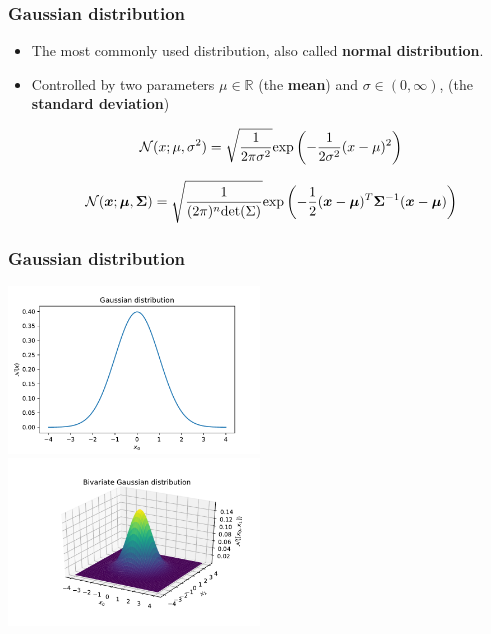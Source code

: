 \documentclass[notes]{beamer}          %
\newcommand{\vect}[1]{\bm{#1}}
\newcommand{\field}[1]{\mathbb{#1}}
\newcommand{\R}{\field{R}}
\begin{document}
\begin{frame}
\frametitle{Gaussian distribution}
\begin{itemize}
    \item The most commonly used distribution, also called {\bf normal distribution}.
    \item Controlled by two parameters $\mu \in \R$ (the {\bf mean}) and $\sigma \in (0, \infty)$, (the {\bf standard deviation})

    $$
    {\cal N}(x ; \mu, \sigma^2) = \sqrt{\frac{1}{2 \pi \sigma^2}} \mbox{exp} \left (-\frac{1}{2 \sigma^2}(x - \mu)^2 \right )
    $$

    $$
    {\cal N}(\vect{x} ; \vect{\mu}, \vect{\Sigma}) = \sqrt{\frac{1}{(2 \pi)^n \mbox{det}(\Sigma)}} \mbox{exp} \left (-\frac{1}{2} (\vect{x} - \vect{\mu})^T \vect{\Sigma}^{-1} (\vect{x} - \vect{\mu}) \right )
    $$


\end{itemize}
\end{frame}


\begin{frame}
\frametitle{Gaussian distribution}
\begin{center}
\includegraphics[width=0.5\textwidth]{figures/week_1/gaussian_1d.pdf}
\hfill
\includegraphics[width=0.5\textwidth]{figures/week_1/gaussian_2d.pdf}
\end{center}
\end{frame}
\end{document}
